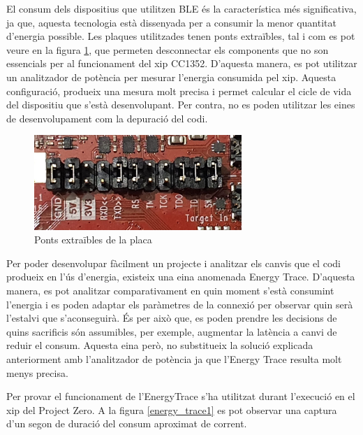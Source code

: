 El consum dels dispositius que utilitzen BLE és la característica més significativa, ja que, aquesta tecnologia està dissenyada per a consumir la menor quantitat d'energia possible.
Les plaques utilitzades tenen ponts extraïbles, tal i com es pot veure en la figura \ref{ponts_extraibles}, que permeten desconnectar els components que no son essencials per al funcionament del xip CC1352.
D'aquesta manera, es pot utilitzar un analitzador de potència per mesurar l'energia consumida pel xip.
Aquesta configuració, produeix una mesura molt precisa i permet calcular el cicle de vida del dispositiu que s'està desenvolupant.
Per contra, no es poden utilitzar les eines de desenvolupament com la depuració del codi.


\begin{figure}[h]
	\begin{center}
		\includegraphics[width=0.7\textwidth]{./images/ponts.jpg}
		\caption{Ponts extraïbles de la placa}
		\label{ponts_extraibles}
	\end{center}
\end{figure}

Per poder desenvolupar fàcilment un projecte i analitzar els canvis que el codi produeix en l'ús d'energia, existeix una eina anomenada Energy Trace.
D'aquesta manera, es pot analitzar comparativament en quin moment s'està consumint l'energia i es poden adaptar els paràmetres de la connexió per observar quin serà l'estalvi que s'aconseguirà.
És per això que, es poden prendre les decisions de quins sacrificis són assumibles, per exemple, augmentar la latència a canvi de reduir el consum.
Aquesta eina però, no substitueix la solució explicada anteriorment amb l'analitzador de potència ja que l'Energy Trace resulta molt menys precisa.

Per provar el funcionament de l'EnergyTrace s'ha utilitzat durant l'execució en el xip del Project Zero.
A la figura \ref{energy_trace1} es pot observar una captura d'un segon de duració del consum aproximat de corrent.

